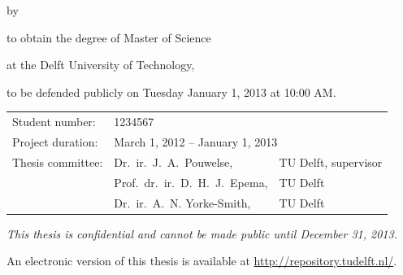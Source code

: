 \begin{titlepage}


\begin{center}


{\makeatletter
\largetitlestyle\fontsize{64}{94}\selectfont\@title
\makeatother}

{\makeatletter
\ifx\@subtitle\undefined\else
    \bigskip
   {\tudsffamily\fontsize{22}{32}\selectfont\@subtitle}    
\fi
\makeatother}

\bigskip
\bigskip

by

\bigskip
\bigskip

{\makeatletter
\largetitlestyle\fontsize{26}{26}\selectfont\@author
\makeatother}

\bigskip
\bigskip

to obtain the degree of Master of Science

at the Delft University of Technology,

to be defended publicly on Tuesday January 1, 2013 at 10:00 AM.

\vfill

\begin{tabular}{lll}
    Student number: & 1234567 \\
    Project duration: & \multicolumn{2}{l}{March 1, 2012 -- January 1, 2013} \\
    Thesis committee: & Dr.\ ir.\ J.\ A.\ Pouwelse, & TU Delft, supervisor \\
        & Prof.\ dr.\ ir.\ D.\  H.\ J.\ Epema, & TU Delft \\
        & Dr.\ ir.\ A.\ N. Yorke-Smith, & TU Delft
\end{tabular}

\bigskip
\bigskip
\emph{This thesis is confidential and cannot be made public until December 31, 2013.}

\bigskip
\bigskip
An electronic version of this thesis is available at \url{http://repository.tudelft.nl/}.


\end{center}
\end{titlepage}
